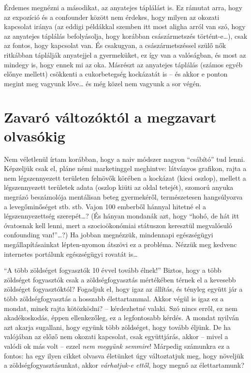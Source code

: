 \documentclass[magyar,]{book}
\begin{document}
Érdemes megnézni a másodikat, az anyatejes táplálást is. Ez rámutat arra, hogy az expozíció és a confounder között nem érdekes, hogy milyen az okozati kapcsolat iránya (az eddigi példákkal szemben itt most aligha arról van szó, hogy az anyatejes táplálás befolyásolja, hogy korábban császármetszés történt-e\ldots), csak az fontos, hogy kapcsolat van. És csakugyan, a császármetszéssel szülő nők ritkábban táplálják anyatejjel a gyermeküket, ez így van a valóságban, és most az mindegy is, hogy ennek mi az oka. Másrészt az anyatejes táplálás (számos egyéb előnye mellett) csökkenti a cukorbetegség kockázatát is -- és akkor e ponton megint meg vagyunk lőve\ldots{} és még közel nem vagyunk a sor végén.

\hypertarget{zavaruxf3-vuxe1ltozuxf3ktuxf3l-a-megzavart-olvasuxf3kig}{%
\section{Zavaró változóktól a megzavart olvasókig}\label{zavaruxf3-vuxe1ltozuxf3ktuxf3l-a-megzavart-olvasuxf3kig}}

Nem véletlenül írtam korábban, hogy a naiv módszer nagyon \enquote{csábító} tud lenni. Képzeljük csak el, pláne némi marketinggel meghintve: látványos grafikon, rajta a nem légszennyezett területen felnövők körében a kockázat (kicsi oszlop), mellett a légszennyezett területek adata (oszlop kiüti az oldal tetejét), szomorú anyuka megrázó beszámolója mentálisan beteg gyermekéről, természetesen hangsúlyozva a levegőminőséget stb. stb. Vajon 100 emberből hánnyal hitetné el a légszennyezettség szerepét\ldots? (És hányan mondanák azt, hogy \enquote{hohó, de hát itt óvatosnak kell lenni, mert a szocioökonómiai státuszon keresztül megvalósuló confounding van!}\ldots?)
Ha jobban megnézzük, mindennapi egészségügyi megállapításainkat lépten-nyomon átszövi ez a probléma. Nézzük meg kedvenc internetes portálunk egészségügyi rovatát is\ldots{}

\enquote{A több zöldséget fogyasztók 10 évvel tovább élnek!} Biztos, hogy a több zöldséget fogyasztók csak a zöldségfogyasztás mértékében térnek el a kevesebb zöldséget fogyasztóktól? Fogadjuk el, hogy igaz az állítás, és tényleg együtt jár a több zöldségfogyasztás a hosszabb élettartammal. Akkor végül is igaz ez a mondat, minek rajta kötözködni? -- kérdezhetné valaki. Szó nincs erről, ez nem akadékoskodás, éppen ellenkezőleg, ez a legfontosabb kérdés. A mondat nyilván azt akarja sugallani, hogy együnk több zöldséget, hogy tovább éljünk. De ha valójában az előző nem okozati kapcsolat, csak együttjárás, akkor -- mivel a valódi ok más volt -- ezzel \emph{nem megyünk semmire}! Márpedig számunkra ez a fontos: ha egy ilyen cikket olvasva életünket úgy változtatjuk meg, hogy növeljük a zöldségfogyasztásunkat, akkor \emph{várhatjuk-e ettől}, hogy megnő az élettartamunk?
\end{document}
